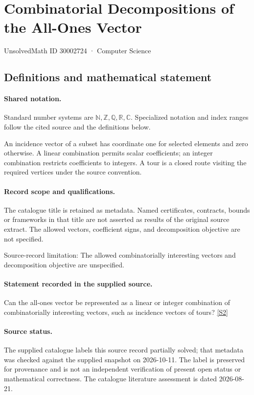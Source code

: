 \documentclass[11pt]{article}
\newcommand{\sref}[2]{\hyperlink{source:#1:#2}{[S#2]}}
\begin{document}
\setcounter{section}{30002723}
\section{Combinatorial Decompositions of the All-Ones Vector}\label{30002724}
{\small\sffamily UnsolvedMath ID 30002724 · Computer Science}
\subsection{Definitions and mathematical statement}

\paragraph{Shared notation.}Standard number systems are $\mathbb N,\mathbb Z,\mathbb Q,\mathbb R,\mathbb C$. Specialized notation and index ranges follow the cited source and the definitions below.


An incidence vector of a subset has coordinate one for selected elements and zero otherwise. A linear combination permits scalar coefficients; an integer combination restricts coefficients to integers. A tour is a closed route visiting the required vertices under the source convention.
\paragraph{Record scope and qualifications.}
The catalogue title is retained as metadata. Named certificates, contracts, bounds or frameworks in that title are not asserted as results of the original source extract.
The allowed vectors, coefficient signs, and decomposition objective are not specified.

Source-record limitation: The allowed combinatorially interesting vectors and decomposition objective are unspecified.
\paragraph{Statement recorded in the supplied source.}
Can the all-ones vector be represented as a linear or integer combination of combinatorially interesting vectors, such as incidence vectors of tours? \sref{30002724}{2}
\paragraph{Source status.}
The supplied catalogue labels this source record partially solved; that metadata was checked against the supplied snapshot on 2026-10-11. The label is preserved for provenance and is not an independent verification of present open status or mathematical correctness. The catalogue literature assessment is dated 2026-08-21.
\end{document}

